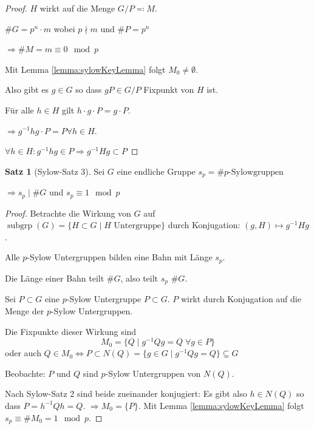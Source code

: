 \documentclass[12pt,parskip=full]{scrartcl}
\theoremstyle{definition}
\newtheorem{theorem}{Satz}[section]
\theoremstyle{remark}
\begin{document}
	\begin{proof}
		$H$ wirkt auf die Menge $G/P \eqqcolon M$.
		
		$\#G = p^n \cdot m$ wobei $p \nmid m$ und $\#P = p^n$
		
		$\Rightarrow \#M = m \equiv 0 \mod p$
		
		Mit Lemma \ref{lemma:sylowKeyLemma} folgt $M_0 \neq \emptyset$.
		
		Also gibt es $g \in G$ so dass $gP \in G/P$ Fixpunkt von $H$ ist.
		
		Für alle $h \in H$ gilt $h \cdot g \cdot P = g \cdot P$.
		
		$\Rightarrow g^{-1} h g \cdot P = P \forall h \in H$.
		
		$\forall h \in H: g^{-1} h g \in P \Rightarrow g^{-1} H g \subset P$
	\end{proof}

	\begin{theorem}[Sylow-Satz 3]
		Sei $G$ eine endliche Gruppe $s_p = \#\text{$p$-Sylowgruppen}$
		
		$\Rightarrow s_p \mid \#G$ und $s_p \equiv 1 \mod p$
	\end{theorem}

	\begin{proof}
		Betrachte die Wirkung von $G$ auf $\operatorname{subgrp}(G) = \{ H \subset G \mid \text{$H$ Untergruppe} \}$ durch Konjugation: $(g, H) \mapsto g^{-1} H g$.
		
		Alle $p$-Sylow Untergruppen bilden eine Bahn mit Länge $s_p$.
		
		Die Länge einer Bahn teilt $\#G$, also teilt $s_p$ $\#G$.
		
		Sei $P \subset G$ eine $p$-Sylow Untergruppe $P \subset G$. $P$ wirkt durch Konjugation auf die Menge der $p$-Sylow Untergruppen.
		
		Die Fixpunkte dieser Wirkung sind
		\begin{equation*}
			M_0 = \{ Q \mid g^{-1} Q g = Q \; \forall g \in P \}
		\end{equation*}
		oder auch $Q \in M_0 \Leftrightarrow P \subset N(Q) = \{ g \in G \mid g^{-1} Q g = Q \} \subseteq G$
		
		Beobachte: $P$ und $Q$ sind $p$-Sylow Untergruppen von $N(Q)$.
		
		Nach Sylow-Satz 2 sind beide zueinander konjugiert: Es gibt also $h \in N(Q)$ so dass $P = h^{-1} Q h = Q$. $\Rightarrow M_0 = \{ P \}$. Mit Lemma \ref{lemma:sylowKeyLemma} folgt $s_p \equiv \# M_0 = 1 \mod p$.
	\end{proof}
\end{document}
